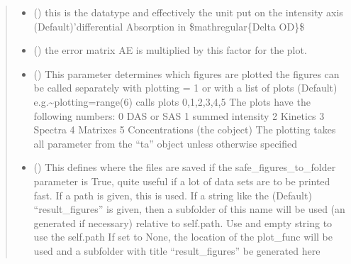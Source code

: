 \documentclass[letterpaper,10pt,english]{sphinxmanual}
\begin{document}
\begin{fulllineitems}
\begin{quote}
\begin{description}
\begin{itemize}
\item {} 
 () \textendash{} this is the datatype and effectively the unit put on the intensity axis
(Default)’differential Absorption in \$mathregular\{Delta OD\}\$

\item {} 
 (\sphinxstyleliteralemphasis{\sphinxupquote{, }}) \textendash{} the error matrix AE is multiplied by this factor for the plot.

\item {} 
 (\sphinxstyleliteralemphasis{\sphinxupquote{ (}}\sphinxstyleliteralemphasis{\sphinxupquote{)}}\sphinxstyleliteralemphasis{\sphinxupquote{, }}) \textendash{} This parameter determines which figures are plotted
the figures can be called separately with plotting = 1
or with a list of plots (Default) e.g.\textasciitilde{}plotting=range(6) calls plots 0,1,2,3,4,5
The plots have the following numbers:           0 \sphinxhyphen{} DAS or SAS          1 \sphinxhyphen{} summed intensity            2 \sphinxhyphen{} Kinetics            3 \sphinxhyphen{} Spectra             4 \sphinxhyphen{} Matrixes            5 \sphinxhyphen{} Concentrations (the c\sphinxhyphen{}object)               The plotting takes all parameter from the “ta” object unless otherwise specified

\item {} 
 (\sphinxstyleliteralemphasis{\sphinxupquote{, }}\sphinxstyleliteralemphasis{\sphinxupquote{, }}) \textendash{} This defines where the files are saved if the safe\_figures\_to\_folder parameter is True,
quite useful if a lot of data sets are to be printed fast.
If a path is given, this is used. If a string like the (Default) “result\_figures” is given,
then a subfolder of this name will be used (an generated if necessary)
relative to self.path. Use and empty string to use the self.path
If set to None, the location of the plot\_func will be used and
a subfolder with title “result\_figures” be generated here


\end{itemize}
\end{description}
\end{quote}
\end{fulllineitems}
\end{document}
